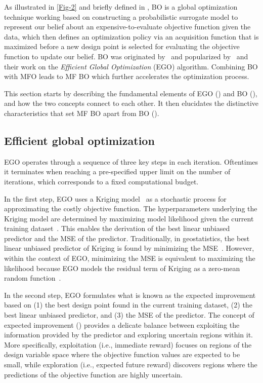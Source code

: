 \documentclass[journal ]{new-aiaa}
\newcommand{\edit}[1]{\textcolor{red!80!black}{#1}} %
\begin{document}
	As illustrated in \cref{Fig-2} and briefly defined in , BO is a global optimization technique working based on constructing a probabilistic surrogate model %
	{to represent our belief about an expensive-to-evaluate objective function given the data, which then defines an optimization policy via an acquisition function that is maximized} before a new design point is selected for evaluating the objective function %
	{to update our belief}.
	BO was originated by~\citet{Mockus1975} and popularized by~\citet{Jones1998} and their work on the \textit{Efficient Global Optimization} (EGO) algorithm.
	Combining BO with MFO leads to MF BO which further accelerates the optimization process.
	
	This section starts by describing the fundamental elements of EGO () and BO (), and how the two concepts connect to each other.
	It then elucidates the distinctive characteristics that set MF BO apart from BO ().
	
	\subsection{Efficient global optimization}\label{Sec31}
	
	EGO operates through a sequence of three key steps in each iteration.
	Oftentimes it terminates when reaching a pre-specified upper limit on the number of iterations,
	which corresponds to a fixed computational budget. 
	
	In the first step, EGO uses a Kriging model~\citep{Sacks1989,Chiles1999}
	as a stochastic process for approximating the costly objective function.
	The hyperparameters underlying the Kriging model are determined by maximizing
	{model likelihood given} the current training dataset~\citep{Jones1998}.
	This enables the derivation of the best linear unbiased predictor and the MSE of the predictor.
	Traditionally, in geostatistics, the best linear unbiased predictor of Kriging is found by
	minimizing the MSE~\citep{Sacks1989,Chiles1999,Kleijnen2009}. 
	However, within the context of EGO, minimizing the MSE is equivalent to maximizing the likelihood
	because EGO models the residual term of Kriging as a zero-mean random function~\citep{Jones1998}.
	
	In the second step, EGO formulates what is known as the expected improvement based on (1) the best design point found in the current training dataset, (2) the best linear unbiased predictor, and (3) the MSE of the predictor.
	The concept of expected improvement () provides a delicate balance between exploiting the information provided by the predictor and exploring uncertain regions within it.
	{More specifically, exploitation (i.e., immediate reward) focuses on regions of the design variable space where the objective function values are expected to be small, while exploration (i.e., expected future reward) discovers regions where the predictions of the objective function are highly uncertain.} 
	
\end{document}
